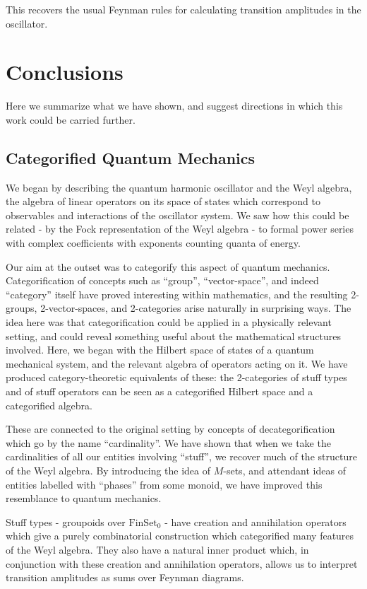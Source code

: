 \documentclass{amsart} \usepackage{amsmath,amssymb,bbm}
\newcommand{\opname}[1]{\operatorname{#1}}
\newcommand{\catname}[1]{\boldsymbol{\opname{{#1}}}}
\newcommand{\FSN}{\catname{FinSet_0}}
\begin{document}
This recovers the usual Feynman rules for calculating transition
amplitudes in the oscillator.

\section{Conclusions}

Here we summarize what we have shown, and suggest directions in which
this work could be carried further.

\subsection{Categorified Quantum Mechanics}

We began by describing the quantum harmonic oscillator and the Weyl
algebra, the algebra of linear operators on its space of states which
correspond to observables and interactions of the oscillator system.
We saw how this could be related - by the Fock representation of the
Weyl algebra - to formal power series with complex coefficients with
exponents counting quanta of energy.

Our aim at the outset was to categorify this aspect of quantum
mechanics.  Categorification of concepts such as ``group'',
``vector-space'', and indeed ``category'' itself have proved
interesting within mathematics, and the resulting 2-groups,
2-vector-spaces, and 2-categories arise naturally in surprising ways.
The idea here was that categorification could be applied in a
physically relevant setting, and could reveal something useful about
the mathematical structures involved.  Here, we began with the Hilbert
space of states of a quantum mechanical system, and the relevant
algebra of operators acting on it.  We have produced
category-theoretic equivalents of these: the 2-categories of stuff
types and of stuff operators can be seen as a categorified Hilbert
space and a categorified algebra.

These are connected to the original setting by concepts of
decategorification which go by the name ``cardinality''.  We have
shown that when we take the cardinalities of all our entities
involving ``stuff'', we recover much of the structure of the Weyl
algebra.  By introducing the idea of $M$-sets, and attendant ideas of
entities labelled with ``phases'' from some monoid, we have improved
this resemblance to quantum mechanics.

Stuff types - groupoids over $\FSN$ - have creation and annihilation
operators which give a purely combinatorial construction which
categorified many features of the Weyl algebra.  They also have a
natural inner product which, in conjunction with these creation and
annihilation operators, allows us to interpret transition amplitudes
as sums over Feynman diagrams.
\end{document}
